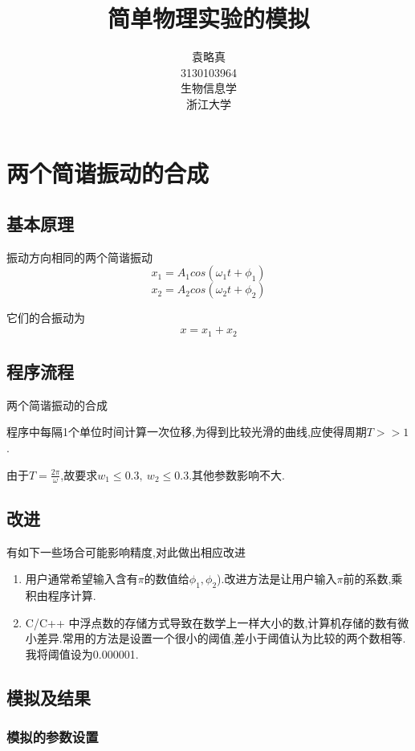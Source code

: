 \documentclass[10pt,a4paper]{article}
\title{简单物理实验的模拟}
\author{袁略真\\3130103964\\生物信息学\\浙江大学}
\begin{document}
\maketitle
\section{两个简谐振动的合成}
\subsection{基本原理}
振动方向相同的两个简谐振动
$$x_1 = A_1cos(\omega_1 t+\phi_1)$$
$$x_2 = A_2cos(\omega_2 t+\phi_2)$$

它们的合振动为$$x=x_1+x_2$$
\subsection{程序流程}
\begin{algorithm}[H]
 \caption{两个简谐振动的合成}
\end{algorithm}

程序中每隔1个单位时间计算一次位移,为得到比较光滑的曲线,应使得周期$T>>1$.

由于$T = \frac{2\pi}{\omega}$,故要求$w_1 \leqslant 0.3,\ w_2 \leqslant 0.3$.其他参数影响不大.

\subsection{改进}
有如下一些场合可能影响精度,对此做出相应改进
\begin{enumerate}
\item 用户通常希望输入含有$\pi$的数值给$\phi_1,\phi_2$).改进方法是让用户输入$\pi$前的系数,乘积由程序计算.
\item C/C++ 中浮点数的存储方式导致在数学上一样大小的数,计算机存储的数有微小差异.常用的方法是设置一个很小的阈值,差小于阈值认为比较的两个数相等.我将阈值设为0.000001.%
\end{enumerate}
\subsection{模拟及结果}
\subsubsection{模拟的参数设置}
\end{document}
